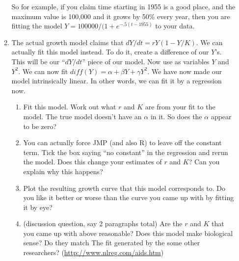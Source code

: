 \documentclass[11pt]{article}
\begin{document}
\begin{enumerate}
\begin{enumerate}
\begin{itemize}
\end{itemize}
So for example, if you claim time starting in 1955 is a good place,
and the maximum value is 100,000 and it grows by 50\% every year, then you
are fitting the model $Y = 100000/(1+e^{-.5(t-1955)}$ to your data.
\item The actual growth model claims that $dY/dt = rY(1 - Y/K)$.  We
can actually fit this model instead.  To do it, create a difference of
our $Y$'s.  This will be our ``$dY/dt$'' piece of our model.  Now use
as variables $Y$ and $Y^2$.  We can now fit $diff(Y) = \alpha + \beta
Y + \gamma Y^2$.  We have now made our model intrinsically linear.  In
other words, we can fit it by a regression now.  
\begin{enumerate}
\item Fit this model.  Work out what $r$ and $K$ are from your fit to
the model.  The true model doesn't have an $\alpha$ in it.  So does the
$\alpha$ appear to be zero?
\item You can actually force JMP (and also R) to leave off the
constant term.  Tick the box saying ``no constant'' in the regression
and rerun the model.  Does this change your estimates of $r$ and $K$?
Can you explain why this happens?
\item Plot the resulting growth curve that this model corresponds to.
Do you like it better or worse than the curve you came up with by
fitting it by eye?
\item (discussion question, say 2 paragraphs total) Are the $r$ and
 $K$ that you came up with above reasonable?  Does this model make
 biological sense?  Do they match The fit generated by the some other
 researchers?
  (\href{http://www.nlreg.com/aids.htm}{http://www.nlreg.com/aids.htm})
\end{enumerate}
\end{enumerate}

\end{enumerate}
\end{document}
